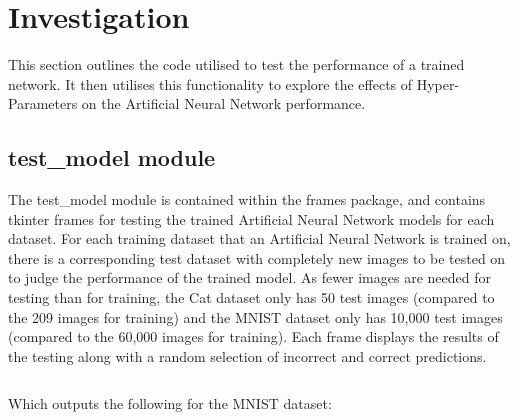 \documentclass[./project-report/src/latex/project-report.tex]{subfiles}
\begin{document}
\maketitle

\clearpage

\section{Investigation}

This section outlines the code utilised to test the performance of a trained network. It then utilises this functionality to explore the effects of Hyper-Parameters on the 
Artificial Neural Network performance.

\subsection{test\_model module}
\label{sec:test_model-module}

The test\_model module is contained within the frames package, and contains tkinter frames for testing the trained Artificial Neural Network models for each dataset. 
For each training dataset that an Artificial Neural Network is trained on, there is a corresponding test dataset with completely new images to be tested on to judge 
the performance of the trained model. As fewer images are needed for testing than for training, the Cat dataset only has 50 test images (compared to the 209 images 
for training) and the MNIST dataset only has 10,000 test images (compared to the 60,000 images for training).
Each frame displays the results of the testing along with a random selection of incorrect and correct predictions.

\inputminted{python}{./school_project/frames/test_model.py}

Which outputs the following for the MNIST dataset:

\pagebreak

\begin{figure}[h!]
\centering
{}
\end{figure}
\end{document}
